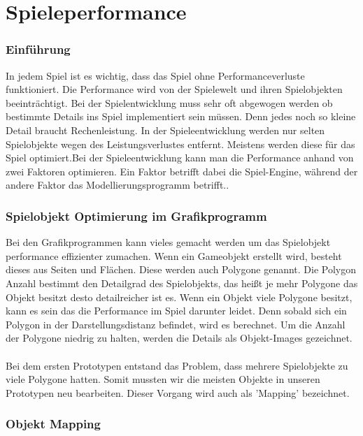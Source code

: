
\pagebreak
{}
\chapter{Spieleperformance}


\subsection{Einführung}
In jedem Spiel ist es wichtig, dass das Spiel ohne Performanceverluste funktioniert. Die Performance wird von der Spielewelt und ihren Spielobjekten beeinträchtigt. Bei der Spielentwicklung muss sehr oft abgewogen werden ob bestimmte Details ins Spiel implementiert sein müssen. Denn jedes noch so kleine Detail braucht Rechenleistung. In der Spieleentwicklung werden nur selten Spielobjekte wegen des Leistungsverlustes entfernt. Meistens werden diese für das Spiel optimiert.Bei der Spieleentwicklung kann man die Performance anhand von zwei Faktoren optimieren. Ein Faktor betrifft dabei die Spiel-Engine, während der andere Faktor das Modellierungsprogramm betrifft.. %

\subsection{Spielobjekt Optimierung im Grafikprogramm}
Bei den Grafikprogrammen kann vieles gemacht werden um das Spielobjekt performance effizienter zumachen. Wenn ein Gameobjekt erstellt wird, besteht dieses aus Seiten und Flächen. Diese werden auch Polygone genannt. Die Polygon Anzahl bestimmt den Detailgrad des Spielobjekts, das heißt je mehr Polygone das Objekt besitzt desto detailreicher ist es. Wenn ein Objekt viele Polygone besitzt, kann es sein das die Performance im Spiel darunter leidet. Denn sobald sich ein Polygon in der Darstellungsdistanz befindet, wird es berechnet. Um die Anzahl der Polygone niedrig zu halten, werden die Details als \glqq Objekt-Images \grqq \space gezeichnet. \\\\ %
Bei dem ersten Prototypen entstand das Problem, dass mehrere Spielobjekte zu viele Polygone hatten. Somit mussten wir die meisten Objekte in unseren Prototypen neu bearbeiten. Dieser Vorgang wird auch als 'Mapping' bezeichnet.
\pagebreak
\subsection{Objekt Mapping}

